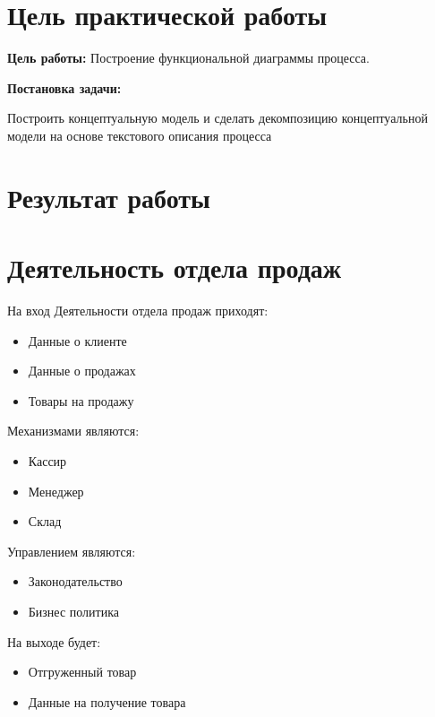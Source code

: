 
\section*{\LARGE Цель практической работы}

\textbf{Цель работы:} Построение функциональной диаграммы процесса.



\textbf{Постановка задачи:}\par
Построить концептуальную модель и сделать
декомпозицию концептуальной модели на основе текстового описания
процесса


\newpage

\section*{\LARGE Результат работы}

\section{Деятельность отдела продаж}

На вход Деятельности отдела продаж приходят:
\begin{itemize}
	\item Данные о клиенте
	\item Данные о продажах
	\item Товары на продажу
\end{itemize}

Механизмами являются:
\begin{itemize}
	\item Кассир
	\item Менеджер
	\item Склад
\end{itemize}

Управлением являются:
\begin{itemize}
	\item Законодательство
	\item Бизнес политика
\end{itemize}

На выходе будет:
\begin{itemize}
	\item Отгруженный товар
	\item Данные на получение товара
\end{itemize}


